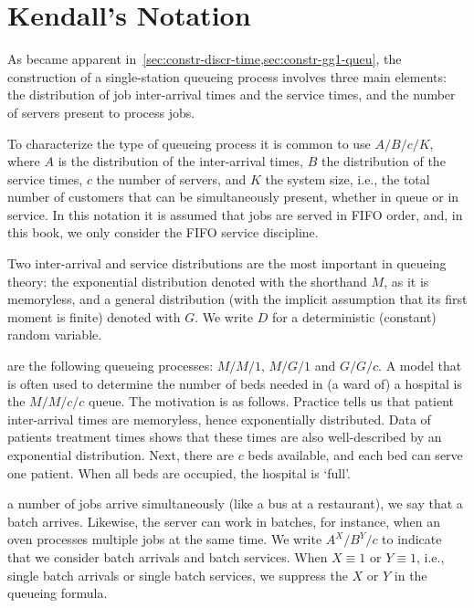 
\section{Kendall's Notation}
\label{sec:kendalls-notation}

As became apparent in~\cref{sec:constr-discr-time,sec:constr-gg1-queu}, the construction of a single-station queueing process involves three main elements: the distribution of job inter-arrival times and the service times, and the number of servers present to process jobs.



To characterize the type of queueing process it is common to use 
 $A/B/c/K$, where $A$ is the distribution of the
inter-arrival times, $B$ the distribution of the service times, $c$ the
number of servers, and $K$ the system size, i.e., the total number of customers that can be simultaneously present, whether in queue or in service.
In this notation it is assumed that jobs are served in FIFO order, and, in this book, we only consider the FIFO service discipline. 


Two inter-arrival and service distributions are the most important in queueing theory: the exponential distribution denoted with the shorthand $M$, as it is memoryless, and a general distribution (with the implicit assumption that its first moment is finite) denoted with $G$. We write $D$ for a deterministic (constant) random variable. 

 are the following queueing processes: $M/M/1$, $M/G/1$ and $G/G/c$.
A model that is often used to determine the number of beds needed in (a ward of) a hospital is the $M/M/c/c$ queue.
The motivation is as follows.
Practice tells us that patient inter-arrival times are memoryless, hence exponentially distributed.
Data of patients treatment times shows that these times are also well-described by an exponential distribution.
Next, there are $c$ beds available, and each bed can serve one patient. When all beds are occupied, the hospital is `full'. 


 a number of jobs arrive simultaneously (like a bus at a restaurant), we say that a batch arrives.
Likewise, the server can work in batches, for instance, when an oven processes multiple jobs at the same time.
We write $A^X/B^Y/c$ to indicate that we consider batch arrivals and batch services. 
When $X\equiv 1$ or $Y \equiv 1$, i.e., single batch arrivals or single batch services, we suppress the $X$ or $Y$ in the queueing formula.



